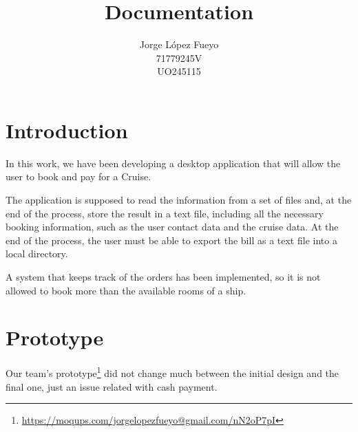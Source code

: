 \documentclass[11pt]{article}
\title{Documentation}
\author{Jorge López Fueyo \\ 71779245V \\ UO245115}
\begin{document}
	
	\newenvironment{qn}{\par\noindent\begin{minipage}{\linewidth}}{\end{minipage}\par}
	
	
	\maketitle
	\newpage

	\section{Introduction}
   
	In this work, we have been developing a desktop application that will allow the user to book and pay for a Cruise.

	The application is supposed to read the information from a set of files and, at the end of the process, store the result in a text file, including all the necessary booking information, such as the user contact data and the cruise data. At the end of the process, the user must be able to export the bill as a text file into a local directory.
   
	A system that keeps track of the orders has been implemented, so it is not allowed to book more than the available rooms of a ship.
   
	\section{Prototype}
	Our team's prototype\footnote{\url{https://moqups.com/jorgelopezfueyo@gmail.com/nN2oP7pI}} did not change much between the initial design and the final one, just an issue related with cash payment.
   
\end{document}
